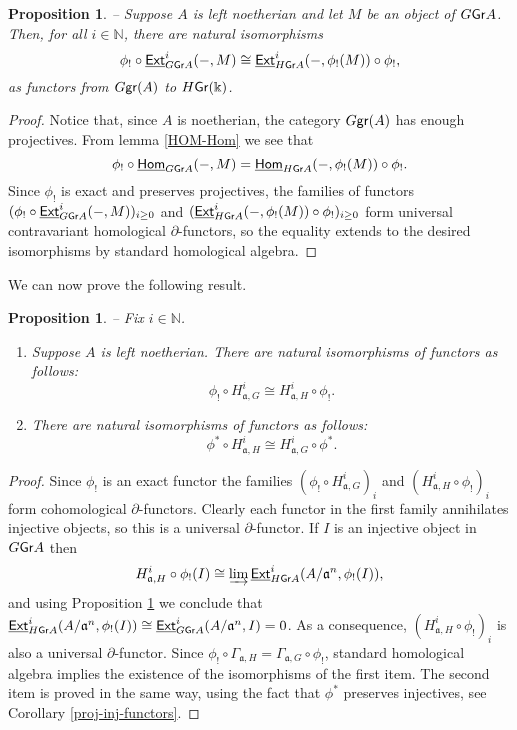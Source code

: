 \documentclass[twoside,11pt]{article}
\renewcommand{\k}{\Bbbk}
\newcommand{\N}{{\mathbb N}}
\renewcommand{\a}{{\mathfrak a}}
\newcommand{\GrMod}{{\sf Gr}}
\newcommand{\grmod}{{\sf gr}}
\newcommand{\HOM}{\underline{{\sf Hom}}}
\newcommand{\EXT}{\underline{\sf Ext}}
\newtheorem{subproposition}[subtheorem]{Proposition}
\begin{document}
\begin{subproposition} -- \label{extension-and-!-and-*} 
Suppose $A$ is left noetherian and let $M$ be an object of $G\GrMod A $. Then, for all
$i\in\N$, there are natural isomorphisms
\[
\phi_! \circ \EXT^i_{G\GrMod A }(-,M) \cong \EXT^i_{H\GrMod A }(-,\phi_!(M)) \circ \phi_!,
\]
as functors from $G\grmod(A)$ to $H\GrMod(\k)$.
\end{subproposition}

\begin{proof} Notice that, since $A$ is noetherian, the category $G\grmod(A)$ has enough
projectives. From lemma \ref{HOM-Hom} we see that
\[
\phi_! \circ \HOM_{G\GrMod A }(-,M) = \HOM_{H\GrMod A }(-,\phi_!(M)) \circ \phi_! .
\]
Since $\phi_!$ is exact and preserves projectives, the families of functors $(\phi_! \circ
\EXT^i_{G\GrMod A }(-,M))_{i \geq 0}$ and  $(\EXT^i_{H\GrMod A }(-,\phi_!(M)) \circ
\phi_!)_{i \geq 0}$ form universal contravariant homological $\partial$-functors, so the
equality extends to the desired isomorphisms by standard homological algebra. \end{proof}

We can now prove the following result.
\begin{subproposition} -- \label{cl-and-!-and-*} 
Fix $i\in\N$.
\begin{enumerate}
\item Suppose $A$ is left noetherian. There are natural isomorphisms of functors as
	follows:
\[
\phi_! \circ H^i_{\a,G} \cong H^i_{\a,H} \circ \phi_!. 
\]
\item There are natural isomorphisms of functors as follows:
\[
\phi^* \circ H^i_{\a,H} \cong H^i_{\a,G} \circ \phi^*. 
\]
\end{enumerate}
\end{subproposition}
\begin{proof}
Since $\phi_!$ is an exact functor the families $(\phi_! \circ H^i_{\a,G})_i$ and
$(H^i_{\a,H} \circ \phi_!)_i$ form cohomological $\partial$-functors. Clearly each functor
in the first family annihilates injective objects, so this is a universal
$\partial$-functor. If $I$ is an injective object in $G\GrMod A$ then
\[
H^i_{\a,H} \circ \phi_!(I) \cong  \varinjlim \EXT_{H\GrMod A}^i(A/\a^n,\phi_!(I)),
\]
and using Proposition \ref{extension-and-!-and-*} we conclude that $\EXT_{H\GrMod
A}^i(A/\a^n,\phi_!(I)) \cong \EXT_{G\GrMod A}^i(A/\a^n,I) = 0$. As a consequence,
$(H^i_{\a,H} \circ \phi_!)_i$ is also a universal $\partial$-functor. Since $\phi_! \circ
\Gamma_{\a,H} = \Gamma_{\a,G} \circ \phi_!$, standard homological algebra implies the
existence of the isomorphisms of the first item. The second item is proved
in the same way, using the fact that $\phi^*$ preserves injectives, see Corollary
\ref{proj-inj-functors}. \end{proof}
\end{document}
